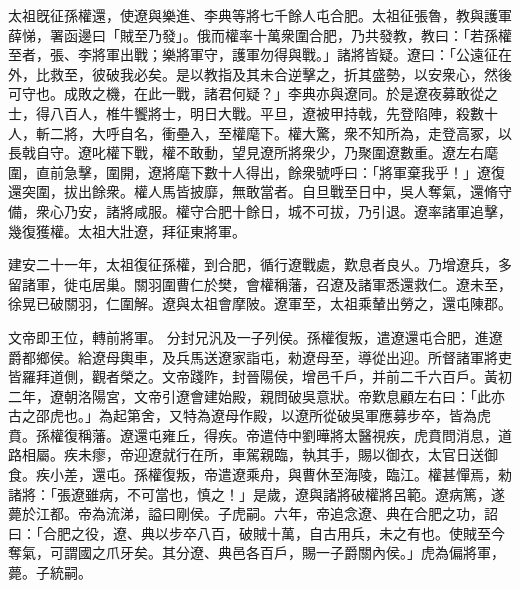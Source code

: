 \begin{pinyinscope}
 
太祖旣征孫權還，使遼與樂進、李典等將七千餘人屯合肥。太祖征張魯，教與護軍薛悌，署函邊曰「賊至乃發」。俄而權率十萬衆圍合肥，乃共發教，教曰：「若孫權至者，張、李將軍出戰；樂將軍守，護軍勿得與戰。」諸將皆疑。遼曰：「公遠征在外，比救至，彼破我必矣。是以教指及其未合逆擊之，折其盛勢，以安衆心，然後可守也。成敗之機，在此一戰，諸君何疑？」李典亦與遼同。於是遼夜募敢從之士，得八百人，椎牛饗將士，明日大戰。平旦，遼被甲持戟，先登陷陣，殺數十人，斬二將，大呼自名，衝壘入，至權麾下。權大驚，衆不知所為，走登高冢，以長戟自守。遼叱權下戰，權不敢動，望見遼所將衆少，乃聚圍遼數重。遼左右麾圍，直前急擊，圍開，遼將麾下數十人得出，餘衆號呼曰：「將軍棄我乎！」遼復還突圍，拔出餘衆。權人馬皆披靡，無敢當者。自旦戰至日中，吳人奪氣，還脩守備，衆心乃安，諸將咸服。權守合肥十餘日，城不可拔，乃引退。遼率諸軍追擊，幾復獲權。太祖大壯遼，拜征東將軍。
 
 
 
 
 建安二十一年，太祖復征孫權，到合肥，循行遼戰處，歎息者良乆。乃增遼兵，多留諸軍，徙屯居巢。關羽圍曹仁於樊，會權稱藩，召遼及諸軍悉還救仁。遼未至，徐晃已破關羽，仁圍解。遼與太祖會摩陂。遼軍至，太祖乘輦出勞之，還屯陳郡。
 
 
文帝即王位，轉前將軍。
 分封兄汎及一子列侯。孫權復叛，遣遼還屯合肥，進遼爵都鄉侯。給遼母輿車，及兵馬送遼家詣屯，勑遼母至，導從出迎。所督諸軍將吏皆羅拜道側，觀者榮之。文帝踐阼，封晉陽侯，增邑千戶，并前二千六百戶。黃初二年，遼朝洛陽宮，文帝引遼會建始殿，親問破吳意狀。帝歎息顧左右曰：「此亦古之邵虎也。」為起第舍，又特為遼母作殿，以遼所從破吳軍應募步卒，皆為虎賁。孫權復稱藩。遼還屯雍丘，得疾。帝遣侍中劉曄將太醫視疾，虎賁問消息，道路相屬。疾未瘳，帝迎遼就行在所，車駕親臨，執其手，賜以御衣，太官日送御食。疾小差，還屯。孫權復叛，帝遣遼乘舟，與曹休至海陵，臨江。權甚憚焉，勑諸將：「張遼雖病，不可當也，慎之！」是歲，遼與諸將破權將呂範。遼病篤，遂薨於江都。帝為流涕，謚曰剛侯。子虎嗣。六年，帝追念遼、典在合肥之功，詔曰：「合肥之役，遼、典以步卒八百，破賊十萬，自古用兵，未之有也。使賊至今奪氣，可謂國之爪牙矣。其分遼、典邑各百戶，賜一子爵關內侯。」虎為偏將軍，薨。子統嗣。
 
 
\end{pinyinscope}